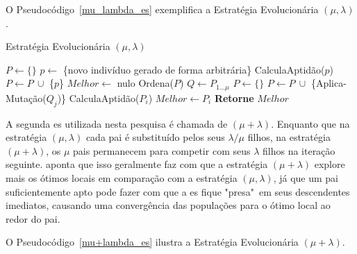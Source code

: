 O Pseudocódigo~\ref{mu_lambda_es} exemplifica a Estratégia Evolucionária 
$( \mu, \lambda )$.

\begin{algorithm}                      %
	\caption{Estratégia Evolucionária $( \mu, \lambda )$}          %
	\label{mu_lambda_es}                           %
	\begin{algorithmic}                    %
		\State $P \gets \{\} $
			\State $p \gets$ \{novo indivíduo gerado de forma arbitrária\}
			\State CalculaAptidão($p$)
			\State $P \gets P \ \cup $ \{$p$\} 
		\EndFor
		\State $Melhor \gets$ nulo
		\Repeat
			\State Ordena($P$) 
			\State $Q \gets P_{1...\mu}$ 
			\State $P \gets \{\}$
					\State $P \gets P \ \cup $ \{Aplica-Mutação($Q_{j}$)\}
				\EndFor
			\EndFor
				\State CalculaAptidão($P_{i}$)
					\State $Melhor \gets P_{i}$
				\EndIf
			\EndFor
		\State \textbf{Retorne} $Melhor$
		\EndProcedure
	\end{algorithmic}
\end{algorithm}

A segunda \ac{es} utilizada nesta pesquisa é chamada de $( \mu + \lambda)$. 
Enquanto que na estratégia $( \mu, \lambda )$ cada pai é substituído pelos seus 
$ \lambda / \mu $ filhos, na estratégia $( \mu + \lambda )$, os $\mu$ pais 
permanecem para competir com seus $ \lambda$ filhos na iteração seguinte. 
\citep{Luke2013Metaheuristics} aponta que isso geralmente faz com que a 
estratégia $( \mu + \lambda )$ explore mais os ótimos locais em comparação com 
a estratégia $( \mu, \lambda )$, já que um pai suficientemente apto pode fazer 
com que a \ac{es} fique "presa"\ em seus descendentes imediatos, causando uma 
convergência das populações para o ótimo local ao redor do pai.

O Pseudocódigo~\ref{mu+lambda_es} ilustra a Estratégia Evolucionária 
$( \mu + \lambda )$.

